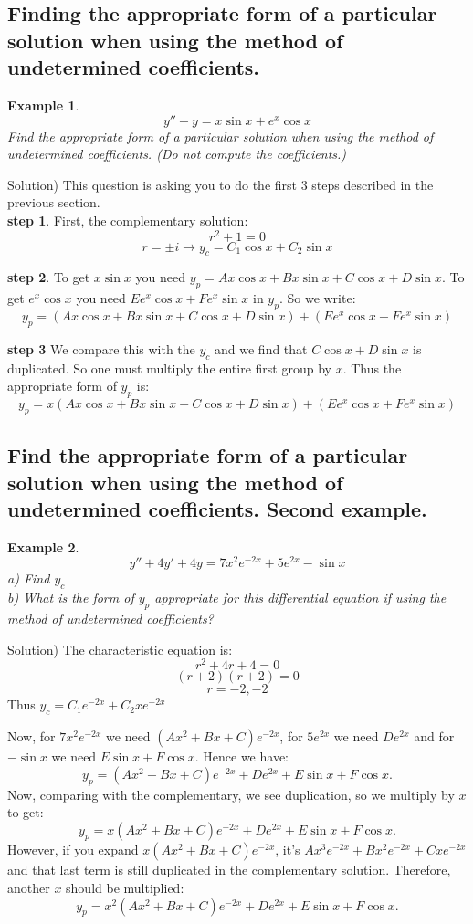 \documentclass[12pt]{report}
\newtheorem{ex}{Example}[section]
\begin{document}
\subsection*{Finding the appropriate form of a particular solution when using the method of undetermined coefficients.}

\begin{ex}
$$y''+y= x \sin x + e^x \cos x$$
Find the appropriate form of a particular solution when using the method of undetermined coefficients. (Do not compute the coefficients.)
\end{ex}
Solution) This question is asking you to do the first 3 steps described in the previous section.\\

\textbf{step 1}. First, the complementary solution:
$$r^2 + 1=0$$
$$r=\pm i \rightarrow y_c = C_1 \cos x + C_2 \sin x$$

\textbf{step 2}. To get $x \sin x$ you need $y_p = A x \cos x + Bx \sin x  +C \cos x +D \sin x$. To get $e^x \cos x$ you need $E e^x \cos x + F e^x \sin x $ in $y_p$. So we write:
$$y_p = \left(A x \cos x + Bx \sin x  +C \cos x +D \sin x\right) +\left(E e^x \cos x + F e^x \sin x\right) $$

\textbf{step 3} We compare this with the $y_c$ and we find that
$C \cos x +D \sin x$ is duplicated. So one must multiply the entire first group by $x$. Thus the appropriate form of $y_p$ is:
$$y_p = x\left(A x \cos x + Bx \sin x  +C \cos x +D \sin x\right) +\left(E e^x \cos x + F e^x \sin x\right) $$

\subsection*{ Find the appropriate form of a particular solution when using the method of undetermined coefficients. Second example. }

\begin{ex}
$$y''+4y' +4y= 7x^2  e^{-2x}+5 e^{2x} - \sin x$$
a) Find $y_c$ \\
b) What is the form of $y_p$ appropriate for this differential equation if using the method of undetermined coefficients?
\end{ex}
Solution) The characteristic equation is:
$$r^2 +4r + 4=0$$
$$ (r+2)(r+2)=0$$
$$r = -2, -2 $$
Thus $y_c = C_1 e^{-2x} + C_2 x e^{-2x}$

Now, for $7x^2  e^{-2x}$ we need $(A x^2 +B x +C)e^{-2x}$, for $5 e^{2x}$ we need $D e^{2x}$ and for $- \sin x$ we need $E \sin x + F \cos x$. Hence we have:
$$y_p =(A x^2 +B x +C)e^{-2x}+ D e^{2x}+E \sin x + F \cos x.$$
Now, comparing with the complementary, we see duplication, so we multiply by $x$ to get:
$$y_p =x(A x^2 +B x +C)e^{-2x}+ D e^{2x}+E \sin x + F \cos x.$$
However, if you expand $x(A x^2 +B x +C)e^{-2x}$, it's $Ax^3e^{-2x}+Bx^2e^{-2x}+Cxe^{-2x}$ and that last term is still duplicated in the complementary solution. Therefore, another $x$ should be multiplied:
$$y_p =x^2(A x^2 +B x +C)e^{-2x}+ D e^{2x}+E \sin x + F \cos x.$$
\end{document}

